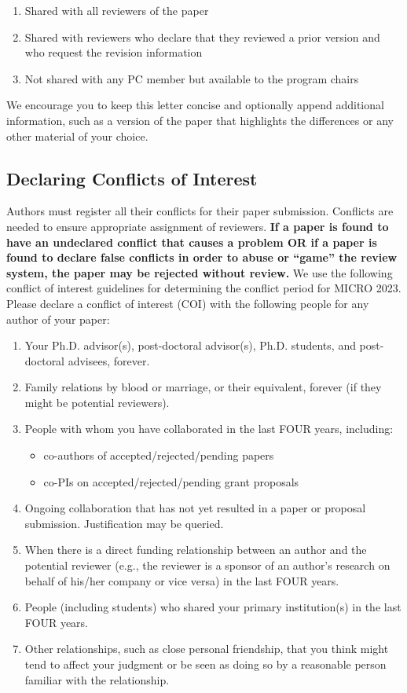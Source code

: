 \documentclass{sig-alternate}
\begin{document}
\begin{enumerate}
\item Shared with all reviewers of the paper 
\item Shared with reviewers who declare that they reviewed a prior version and who request the revision information
\item Not shared with any PC member but available to the program chairs
\end{enumerate}

We encourage you to keep this letter concise and optionally append additional information, such as a version of the paper that highlights the differences or any other material of your choice.

\subsection{Declaring Conflicts of Interest}
Authors must register all their conflicts for their paper submission. Conflicts are needed to ensure appropriate assignment of reviewers. {\bf If a paper is found to have an undeclared conflict that causes a problem OR if a paper is found to declare false conflicts in order to abuse or ``game'' the review system, the paper may be rejected without review.} We use the following conflict of interest guidelines for determining the conflict period for MICRO 2023.  Please declare a conflict of interest (COI) with the following people for any author of your paper:

\begin{enumerate}
\item Your Ph.D. advisor(s), post-doctoral advisor(s), Ph.D. students,
      and post-doctoral advisees, forever.
\item Family relations by blood or marriage, or their equivalent,
      forever (if they might be potential reviewers).
\item People with whom you have collaborated in the last FOUR years, including:
  \begin{itemize}
  \item co-authors of accepted/rejected/pending papers
  \item co-PIs on accepted/rejected/pending grant proposals
  \end{itemize}
\item Ongoing collaboration that has not yet resulted in a paper or proposal submission. Justification may be queried.
\item When there is a direct funding relationship between an author and the potential reviewer (e.g., the reviewer is a sponsor of an author's research on behalf of his/her company or vice versa) in the last FOUR years.
\item People (including students) who shared your primary institution(s) in the last FOUR years.
\item Other relationships, such as close personal friendship, that you think might tend
to affect your judgment or be seen as doing so by a reasonable person familiar
with the relationship.
\end{enumerate}
\end{document}
